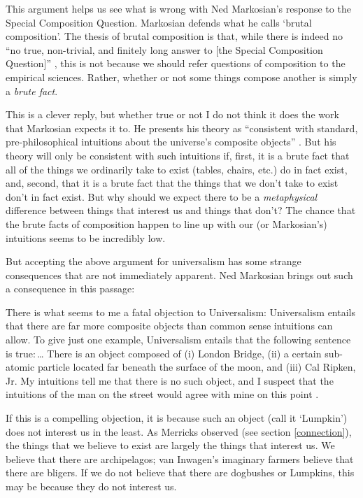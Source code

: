 \documentclass[11pt]{article}
\newenvironment{squote}{%
\begin{spacing}{1}
       	\begin{list}{}{%
\setlength{\labelwidth}{0pt}%
\rightmargin\leftmargin%
}
\item\relax
}{%
\end{list}%
\end{spacing}
}
\begin{document}
\begin{spacing}{1.25}
This argument helps us see what is wrong with Ned Markosian's response
to the Special Composition Question.  Markosian defends what he calls
`brutal composition'.  The thesis of brutal composition is that, while
there is indeed no ``no true, non-trivial, and finitely long answer to
[the Special Composition Question]''
\citeyearpar[214]{markosian1998a}, this is not because we should refer
questions of composition to the empirical sciences.  Rather, whether
or not some things compose another is simply a {\em brute fact}.

This is a clever reply, but whether true or not I do not think it does
the work that Markosian expects it to.  He presents his theory as
``consistent with standard, pre-philosophical intuitions about the
universe's composite objects'' \citeyearpar[211]{markosian1998a}.  But
his theory will only be consistent with such intuitions if, first, it
is a brute fact that all of the things we ordinarily take to exist
(tables, chairs, etc.) do in fact exist, and, second, that it is a
brute fact that the things that we don't take to exist don't in fact
exist.  But why should we expect there to be a {\em metaphysical}
difference between things that interest us and things that don't?  The
chance that the brute facts of composition happen to line up with our
(or Markosian's) intuitions seems to be incredibly low.

But accepting the above argument for universalism has some strange
consequences that are not immediately apparent.  Ned Markosian brings
out such a consequence in this passage:

\begin{squote}
There is what seems to me a fatal objection to Universalism:
Universalism entails that there are far more composite objects than
common sense intuitions can allow.  To give just one example,
Universalism entails that the following sentence is true:\,\ldots
There is an object composed of (i) London Bridge, (ii) a certain
sub-atomic particle located far beneath the surface of the moon, and
(iii) Cal Ripken, Jr.  My intuitions tell me that there is no such
object, and I suspect that the intuitions of the man on the street
would agree with mine on this point \citeyearpar[228]{markosian1998a}.
\end{squote}

If this is a compelling objection, it is because such an object (call
it `Lumpkin') does not interest us in the least.  As Merricks observed
(see section \ref{connection}), the things that we believe to exist
are largely the things that interest us.  We believe that there are
archipelagos; van Inwagen's imaginary farmers believe that there are
bligers.  If we do not believe that there are dogbushes or Lumpkins,
this may be because they do not interest us.


\end{spacing}
\end{document}
